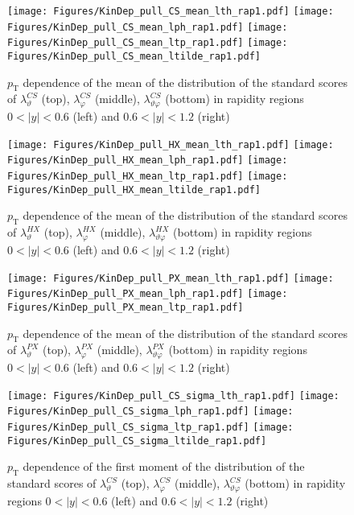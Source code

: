 \documentclass[12pt]{article}
\newcommand{\pT}{p_\mathrm{T}}
\newcommand{\absy}{\left |  y \right |}
\newcommand{\lamthCS}{\lambda^{\scriptscriptstyle CS}_\vartheta}
\newcommand{\lamphCS}{\lambda^{\scriptscriptstyle CS}_\varphi}
\newcommand{\lamthphCS}{\lambda^{\scriptscriptstyle CS}_{\vartheta \varphi}}
\newcommand{\lamthHX}{\lambda^{\scriptscriptstyle HX}_\vartheta}
\newcommand{\lamphHX}{\lambda^{\scriptscriptstyle HX}_\varphi}
\newcommand{\lamthphHX}{\lambda^{\scriptscriptstyle HX}_{\vartheta \varphi}}
\newcommand{\lamthPX}{\lambda^{\scriptscriptstyle PX}_\vartheta}
\newcommand{\lamphPX}{\lambda^{\scriptscriptstyle PX}_\varphi}
\newcommand{\lamthphPX}{\lambda^{\scriptscriptstyle PX}_{\vartheta \varphi}}
\begin{document}


\begin{figure}[htbp]
\centering
\texttt{[image: Figures/KinDep\_pull\_CS\_mean\_lth\_rap1.pdf]}
\texttt{[image: Figures/KinDep\_pull\_CS\_mean\_lph\_rap1.pdf]}
\texttt{[image: Figures/KinDep\_pull\_CS\_mean\_ltp\_rap1.pdf]}
\texttt{[image: Figures/KinDep\_pull\_CS\_mean\_ltilde\_rap1.pdf]}
\caption{$\pT$ dependence of the mean of the distribution of the standard scores
of $\lamthCS$ (top), $\lamphCS$ (middle), $\lamthphCS$ (bottom) in rapidity
regions $0<\absy<0.6$ (left) and $0.6<\absy<1.2$ (right)}
\end{figure}
\clearpage

\begin{figure}[htbp]
\centering
\texttt{[image: Figures/KinDep\_pull\_HX\_mean\_lth\_rap1.pdf]}
\texttt{[image: Figures/KinDep\_pull\_HX\_mean\_lph\_rap1.pdf]}
\texttt{[image: Figures/KinDep\_pull\_HX\_mean\_ltp\_rap1.pdf]}
\texttt{[image: Figures/KinDep\_pull\_HX\_mean\_ltilde\_rap1.pdf]}
\caption{$\pT$ dependence of the mean of the distribution of the standard scores
of $\lamthHX$ (top), $\lamphHX$ (middle), $\lamthphHX$ (bottom) in rapidity
regions $0<\absy<0.6$ (left) and $0.6<\absy<1.2$ (right)}
\end{figure}
\clearpage

\begin{figure}[htbp]
\centering
\texttt{[image: Figures/KinDep\_pull\_PX\_mean\_lth\_rap1.pdf]}
\texttt{[image: Figures/KinDep\_pull\_PX\_mean\_lph\_rap1.pdf]}
\texttt{[image: Figures/KinDep\_pull\_PX\_mean\_ltp\_rap1.pdf]}
\caption{$\pT$ dependence of the mean of the distribution of the standard scores
of $\lamthPX$ (top), $\lamphPX$ (middle), $\lamthphPX$ (bottom) in rapidity
regions $0<\absy<0.6$ (left) and $0.6<\absy<1.2$ (right)}
\end{figure}
\clearpage




\begin{figure}[htbp]
\centering
\texttt{[image: Figures/KinDep\_pull\_CS\_sigma\_lth\_rap1.pdf]}
\texttt{[image: Figures/KinDep\_pull\_CS\_sigma\_lph\_rap1.pdf]}
\texttt{[image: Figures/KinDep\_pull\_CS\_sigma\_ltp\_rap1.pdf]}
\texttt{[image: Figures/KinDep\_pull\_CS\_sigma\_ltilde\_rap1.pdf]}
\caption{$\pT$ dependence of the first moment of the distribution of the
standard scores of $\lamthCS$ (top), $\lamphCS$ (middle), $\lamthphCS$ (bottom)
in rapidity regions $0<\absy<0.6$ (left) and $0.6<\absy<1.2$ (right)}
\end{figure}
\clearpage
\end{document}

